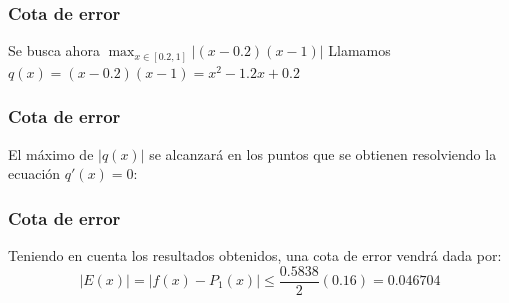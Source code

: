 \documentclass{beamer}
\begin{document}
{
\frametitle{Cota de error}
Se busca ahora $\displaystyle\max_{x\in[0.2,1]}|(x-0.2)(x-1)|$
Llamamos $q(x)=(x - 0.2)(x - 1) = x^2 - 1.2x + 0.2$
}
\frame
{
\frametitle{Cota de error}
El m\'aximo de $|q(x)|$ se alcanzar\'a en los puntos que se obtienen resolviendo la ecuaci\'on $q'(x) = 0$:
}
\frame
{
\frametitle{Cota de error}
Teniendo en cuenta los resultados obtenidos, una cota de error vendr\'a dada por:
$$
|E(x)| = |f(x)-P_1(x)| \leq \frac{0.5838}{2}(0.16) = 0.046704
$$
}
\frame
\end{document}
